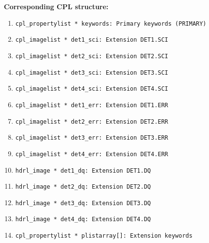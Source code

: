 \begin{datastructdef}
    \textbf{Corresponding \ac{CPL} structure:}
    \begin{enumerate}
            \item \texttt{cpl\_propertylist * keywords: Primary keywords (PRIMARY)}
            \item \texttt{cpl\_imagelist * det1\_sci: Extension DET1.SCI}
            \item \texttt{cpl\_imagelist * det2\_sci: Extension DET2.SCI}
            \item \texttt{cpl\_imagelist * det3\_sci: Extension DET3.SCI}
            \item \texttt{cpl\_imagelist * det4\_sci: Extension DET4.SCI}
            \item \texttt{cpl\_imagelist * det1\_err: Extension DET1.ERR}
            \item \texttt{cpl\_imagelist * det2\_err: Extension DET2.ERR}
            \item \texttt{cpl\_imagelist * det3\_err: Extension DET3.ERR}
            \item \texttt{cpl\_imagelist * det4\_err: Extension DET4.ERR}
            \item \texttt{hdrl\_image * det1\_dq: Extension DET1.DQ}
            \item \texttt{hdrl\_image * det2\_dq: Extension DET2.DQ}
            \item \texttt{hdrl\_image * det3\_dq: Extension DET3.DQ}
            \item \texttt{hdrl\_image * det4\_dq: Extension DET4.DQ}
            \item \texttt{cpl\_propertylist * plistarray[]: Extension keywords}
    \end{enumerate}
\end{datastructdef}

